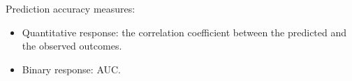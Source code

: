 \documentclass[12pt]{article}
\begin{document}
Prediction accuracy measures: 
\begin{itemize}
\item Quantitative response: the correlation coefficient between the predicted and the observed outcomes. 

\item Binary response: AUC. 
\end{itemize}






%

%



%


\end{document}

